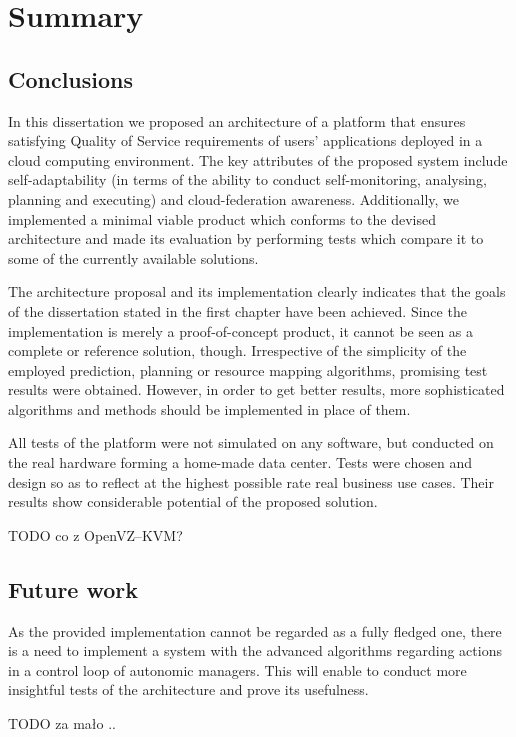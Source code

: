 \chapter{Summary}


\section{Conclusions}
In this dissertation we proposed an architecture of a platform that ensures satisfying Quality of Service requirements of users' applications deployed in a cloud computing environment. The key attributes of the proposed system include self-adaptability (in terms of the ability to conduct self-monitoring, analysing, planning and executing) and cloud-federation awareness. Additionally, we implemented a minimal viable product which conforms to the devised architecture and made its evaluation by performing tests which compare it to some of the currently available solutions.

The architecture proposal and its implementation clearly indicates that the goals of the dissertation stated in the first chapter have been achieved. Since the implementation is merely a proof-of-concept product, it cannot be seen as a complete or reference solution, though. Irrespective of the simplicity of the employed prediction, planning or resource mapping algorithms, promising test results were obtained. However, in order to get better results, more sophisticated algorithms and methods should be implemented in place of them.

All tests of the platform were not simulated on any software, but conducted on the real hardware forming a home-made data center. Tests were chosen and design so as to reflect at the highest possible rate real business use cases. Their results show considerable potential of the proposed solution.


TODO co z OpenVZ--KVM?

\section{Future work}
As the provided implementation cannot be regarded as a fully fledged one, there is a need to implement a system with the advanced algorithms regarding actions in a control loop of autonomic managers. This will enable to conduct more insightful tests of the architecture and prove its usefulness.


TODO za mało ..
